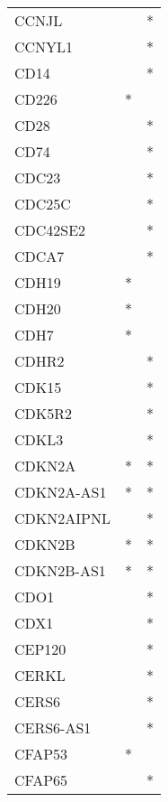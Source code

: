\begin{longtable}{lcc}
CCNJL           &                &          * \\
CCNYL1          &                &          * \\
CD14            &                &          * \\
CD226           &              * &            \\
CD28            &                &          * \\
CD74            &                &          * \\
CDC23           &                &          * \\
CDC25C          &                &          * \\
CDC42SE2        &                &          * \\
CDCA7           &                &          * \\
CDH19           &              * &            \\
CDH20           &              * &            \\
CDH7            &              * &            \\
CDHR2           &                &          * \\
CDK15           &                &          * \\
CDK5R2          &                &          * \\
CDKL3           &                &          * \\
CDKN2A          &              * &          * \\
CDKN2A-AS1      &              * &          * \\
CDKN2AIPNL      &                &          * \\
CDKN2B          &              * &          * \\
CDKN2B-AS1      &              * &          * \\
CDO1            &                &          * \\
CDX1            &                &          * \\
CEP120          &                &          * \\
CERKL           &                &          * \\
CERS6           &                &          * \\
CERS6-AS1       &                &          * \\
CFAP53          &              * &            \\
CFAP65          &                &          * \\

\end{longtable}
